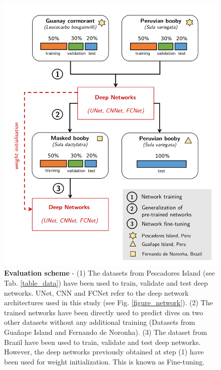 \documentclass{article}
\begin{document}
\begin{figure}[!h]
  \includegraphics[scale=0.7]{figure_framework.png}
  \caption{\textbf{Evaluation scheme} - (1) The datasets from Pescadores Island (see Tab. \ref{table_data}) have been used to train, validate and test deep networks. UNet, CNN and FCNet refer to the deep network architectures used in this study (see Fig. \ref{figure_network}). (2) The trained networks have been directly used to predict dives on two other datasets without any additional training (Datasets from Guañape Island and Fernando de Noronha). (3) The dataset from Brazil have been used to train, validate and test deep networks. However, the deep networks previously obtained at step (1) have been used for weight initialization. This is known as Fine-tuning.}
  \label{figure_framework}
\end{figure}
\end{document}
